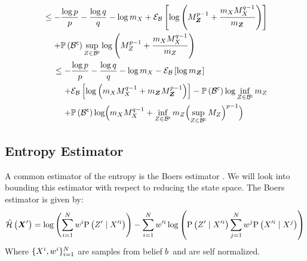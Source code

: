 \begin{proofE}
\begin{align*}
		\begin{split}
			& \leq -\frac{\log p}{p}-\frac{\log q}{q}-\log m_{\states{}}+\partialexpectation{\log\left( M_{\observationsRV{}}^{p-1}+\frac{m_{\states{}}M_{\states{}}^{q-1}}{m_{\observationsRV{}}}\right)}{\subSpace}                                        \\
			& \phantomeq+\measure{\stcomp{\subSpace}}\sup_{\observations{}\in\stcomp{\subSpace}}\log\left( M_{\observations{}}^{p-1}+\frac{m_{\states{}}M_{\states{}}^{q-1}}{m_{\observations{}}}\right)
		\end{split} \\
		\begin{split}
			& \leq-\frac{\log p}{p}-\frac{\log q}{q}-\log m_{\states{}}-\partialexpectation{\log m_{\observationsRV{}}}{\subSpace}\\
			&\phantomeq+\partialexpectation{\log\left(m_{\states{}}M_{\states{}}^{q-1}+m_{\observationsRV{}}M_{\observationsRV{}}^{p-1}\right)}{\subSpace}
			-\measure{\stcomp{\subSpace}}\log\inf_{\observations{}\in\stcomp{\subSpace}}m_{\observations{}}\\
			& \phantomeq+\measure{\stcomp{\subSpace}}\log\Bigl( m_{\states{}}M_{\states{}}^{q-1}
			+\inf_{\observations{}\in\stcomp{\subSpace}}m_{\observations{}}\Bigl(\sup_{\observations{}\in\stcomp{\subSpace}}M_{\observations{}}\Bigr)^{p-1}\Bigr)
		\end{split}
	\end{align*}
\end{proofE}

\subsection{Entropy Estimator}
A common estimator of the entropy is the Boers estimator \cite{Boers10fusion}. We will look into bounding this estimator with respect to reducing the state space. The Boers estimator is given by:
\begin{equation}
	\label{eq:boers}
		\entropyEstimator{\statesRV{}^\prime}=\log\left(\sum_{i=1}^N\weight{}{i}\probcond{\observations{}^\prime}{\states{}^{\prime i}}\right)-\sum_{i=1}^N\weight{}{\prime i}\log\left(\probcond{\observations{}^\prime }{\states{}^{\prime i}}\sum_{j=1}^N\weight{}{j}\probcond{\states{}^{\prime i}}{\states{}^{j}}\right)
\end{equation}
Where $\{X_{}^i,w_{}^{i}\}_{i=1}^N$ are samples from belief $b_{}$ and are self normalized.

